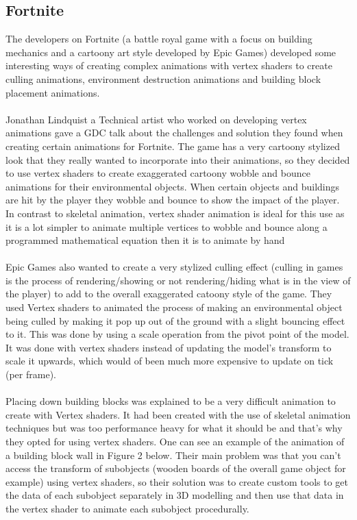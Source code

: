 \documentclass{scrartcl}
\begin{document}
\subsection{Fortnite}
The developers on Fortnite (a battle royal game with a focus on building mechanics and a cartoony art style developed by Epic Games) developed some interesting ways of creating complex animations with vertex shaders to create culling animations, environment destruction animations and building block placement animations.
\\~\\
Jonathan Lindquist a Technical artist who worked on developing vertex animations gave a GDC talk about the challenges and solution they found when creating certain animations for Fortnite.\cite{thirteen} The game has a very cartoony stylized look that they really wanted to incorporate into their animations, so they decided to use vertex shaders to create exaggerated cartoony wobble and bounce animations for their environmental objects. When certain objects and buildings are hit by the player they wobble and bounce to show the impact of the player. In contrast to skeletal animation, vertex shader animation is ideal for this use as it is a lot simpler to animate multiple vertices to wobble and bounce along a programmed mathematical equation then it is to animate by hand
\\~\\
Epic Games also wanted to create a very stylized culling effect (culling in games is the process of rendering/showing or not rendering/hiding what is in the view of the player) to add to the overall exaggerated catoony style of the game. They used Vertex shaders to animated the process of making an environmental object being culled by making it pop up out of the ground with a slight bouncing effect to it. This was done by using a scale operation from the pivot point of the model. It was done with vertex shaders instead of updating the model's transform to scale it upwards, which would of been much more expensive to update on tick (per frame).
\\~\\
Placing down building blocks was explained to be a very difficult animation to create with Vertex shaders. It had been created with the use of skeletal animation techniques but was too performance heavy for what it should be and that's why they opted for using vertex shaders. One can see an example of the animation of a building block wall in Figure 2 below. Their main problem was that you can't access the transform of subobjects (wooden boards of the overall game object for example) using vertex shaders, so their solution was to create custom tools to get the data of each subobject separately in 3D modelling and then use that data in the vertex shader to animate each subobject procedurally.
\end{document}
